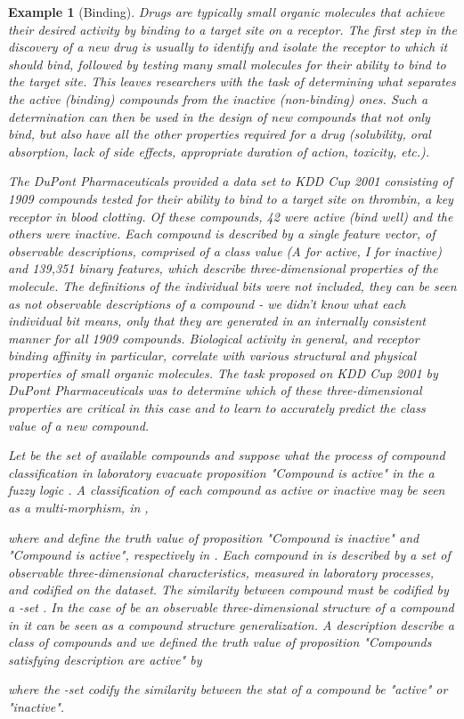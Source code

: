 \documentclass[oribibl]{llncs}
\newtheorem{exam}{Example}
\begin{document}
\begin{exam}[Binding]
Drugs are typically small organic molecules that achieve their desired
activity by binding to a target site on a receptor. The first step in
the discovery of a new drug is usually to identify and isolate the
receptor to which it should bind, followed by testing many small
molecules for their ability to bind to the target site. This leaves
researchers with the task of determining what separates the active
(binding) compounds from the inactive (non-binding) ones.  Such a
determination can then be used in the design of new compounds that not
only bind, but also have all the other properties required for a drug
(solubility, oral absorption, lack of side effects, appropriate duration
of action, toxicity, etc.).

The DuPont Pharmaceuticals provided a data set to KDD Cup 2001 consisting of 1909 compounds tested for their ability to bind to a target site on thrombin, a key receptor in blood clotting. Of these compounds, 42
were active (bind well) and the others were inactive. Each compound is
described by a single feature vector, of observable descriptions, comprised of a class value (A for
active, I for inactive) and 139,351 binary features, which describe
three-dimensional properties of the molecule. The definitions of the
individual bits were not included, they can be seen as not observable descriptions of a compound - we didn't know what each individual
bit means, only that they are generated in an internally consistent
manner for all 1909 compounds. Biological activity in general, and
receptor binding affinity in particular, correlate with various
structural and physical properties of small organic molecules. The task
proposed on KDD Cup 2001 by DuPont Pharmaceuticals  was to determine which of these three-dimensional properties are critical in this case and to learn to accurately predict the class value of a new compound.

Let  be the set of available compounds and suppose what the process of compound classification in laboratory evacuate proposition "Compound  is active" in the a fuzzy logic . A classification of each compound as active or inactive may be seen as a multi-morphism, in ,

where  and  define the truth value of proposition "Compound  is inactive" and "Compound  is active", respectively in . Each compound in  is described by a set of observable three-dimensional characteristics, measured in laboratory processes, and codified on the dataset. The similarity between compound must be codified by a -set . In the case of  be an observable three-dimensional structure of a compound in  it can be seen as a compound structure generalization. A description  describe a class of compounds  and we defined the truth value of proposition "Compounds satisfying description  are active" by

where the -set  codify the similarity between the stat of a compound be "active" or "inactive".
\end{exam}
\end{document}
